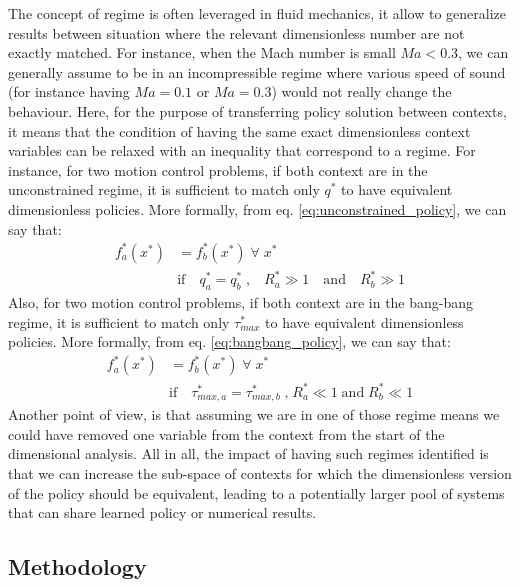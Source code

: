 The concept of regime is often leveraged in fluid mechanics, it allow to generalize results between situation where the relevant dimensionless number are not exactly matched. For instance, when the Mach number is small $Ma < 0.3$, we can generally assume to be in an incompressible regime where various speed of sound (for instance having $Ma=0.1$ or $Ma=0.3$) would not really change the behaviour. Here, for the purpose of transferring policy solution between contexts, it means that the condition of having the same exact dimensionless context variables can be relaxed with an inequality that correspond to a regime. For instance, for two motion control problems, if both context are in the unconstrained regime, it is sufficient to match only $q^*$ to have equivalent dimensionless policies. More formally, from eq. \eqref{eq:unconstrained_policy}, we can say that:
\begin{align}
f_a^*(x^*) &= f_b^*(x^*) \;\forall\;  x^* 
\\ &\text{if} \quad q^*_a=q^*_b \; \text{,} \quad R^*_a \gg 1 \quad \text{and} \quad R^*_b \gg 1
\end{align}
Also, for two motion control problems, if both context are in the bang-bang regime, it is sufficient to match only $\tau_{max}^*$ to have equivalent dimensionless policies. More formally, from eq. \eqref{eq:bangbang_policy}, we can say that:
\begin{align}
f_a^*(x^*) &= f_b^*(x^*) \;\forall\;  x^* 
\\ &\text{if} \quad \tau_{max,a}^*=\tau_{max,b}^* \; \text{,} \; R^*_a \ll 1 \; \text{and} \; R^*_b \ll 1
\end{align}
Another point of view, is that assuming we are in one of those regime means we could have removed one variable from the context from the start of the dimensional analysis. All in all, the impact of having such regimes identified is that we can increase the sub-space of contexts for which the dimensionless version of the policy should be equivalent, leading to a potentially larger pool of systems that can share learned policy or numerical results. 








\subsection{Methodology}
\label{sec:metho}

